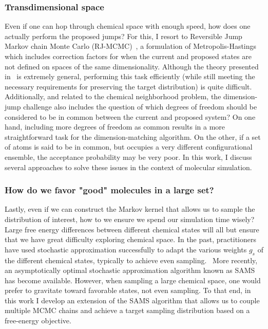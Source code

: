 \subsubsection{Transdimensional space}
%
Even if one can hop through chemical space with enough speed, how does one actually perform the proposed jumps?
%
For this, I resort to Reversible Jump Markov chain Monte Carlo (RJ-MCMC)~\cite{GREEN1995}, a formulation of Metropolis-Hastings which includes correction factors for when the current and proposed states are not defined on spaces of the same dimensionality.
%
Although the theory presented in~\cite{GREEN1995} is extremely general, performing this task efficiently (while still meeting the necessary requirements for preserving the target distribution) is quite difficult.
%
Additionally, and related to the chemical neighborhood problem, the dimension-jump challenge also includes the question of which degrees of freedom should be considered to be in common between the current and proposed system?
%
On one hand, including more degrees of freedom as common results in a more straightforward task for the dimension-matching algorithm.
%
On the other, if a set of atoms is said to be in common, but occupies a very different configurational ensemble, the acceptance probability may be very poor.
%
In this work, I discuss several approaches to solve these issues in the context of molecular simulation.
%
\subsubsection{How do we favor "good" molecules in a large set?}
%
Lastly, even if we can construct the Markov kernel that allows us to sample the distribution of interest, how to we ensure we spend our simulation time wisely?
%
Large free energy differences between different chemical states will all but ensure that we have great difficulty exploring chemical space.
%
In the past, practitioners have used stochastic approximation successfully to adapt the various weights $g_s$ of the different chemical states, typically to achieve even sampling.~\cite{Wang2001}
%
More recently, an asymptotically optimal stochastic approximation algorithm known as SAMS~\cite{Tan2017} has become available.
%
However, when sampling a large chemical space, one would prefer to gravitate toward favorable states, not even sampling.
%
To that end, in this work I develop an extension of the SAMS algorithm that allows us to couple multiple MCMC chains and achieve a target sampling distribution based on a free-energy objective.
%
